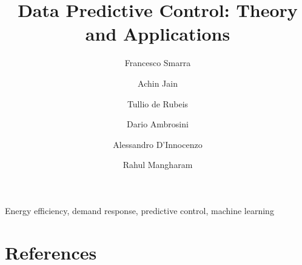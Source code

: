 \documentclass[review]{elsarticle}
\begin{document}
\begin{frontmatter}

\title{Data Predictive Control: Theory and Applications}

\author[FSaddress,EC]{Francesco Smarra}

\author[AJaddress,EC]{Achin Jain}
\author[TDRaddress,EC]{Tullio de Rubeis}
\author[TDRaddress]{Dario Ambrosini}
\author[FSaddress]{Alessandro D'Innocenzo}
\author[AJaddress]{Rahul Mangharam}

\address[FSaddress]{Department of Information Engineering, Computer Science and Mathematics, Universit\`{a} degli Studi dell'Aquila, L'Aquila, Italy}
\address[AJaddress]{Department of Electrical and Systems Engineering, University of Pennsylvania, Philadelphia, USA}
\address[TDRaddress]{Department of Industrial and Information Engineering and Economics, Universit\`{a} degli Studi dell'Aquila, L'Aquila, Italy}
\address[EC]{Equal contribution}

\begin{abstract}

\end{abstract}

\begin{keyword}
Energy efficiency, demand response, predictive control, machine learning
\end{keyword}

\end{frontmatter}









\clearpage






\section*{References}


\end{document}
